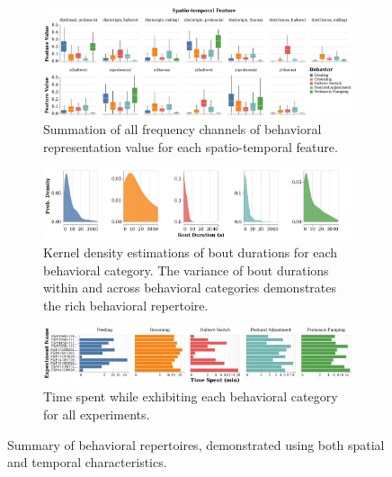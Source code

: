 \begin{figure}[htb!]
	\centering
	\begin{subfigure}[b]{0.995\linewidth}
		\centering
		\includegraphics[width=\linewidth]{figures/FeatureDistributions_perBehavior-Ann.pdf}
		\caption{Summation of all frequency channels of behavioral representation value for each spatio-temporal feature.\label{figure:feature-distributions}}
	\end{subfigure}%

	\centering
	\begin{subfigure}[b]{0.995\linewidth}
		\centering
		\includegraphics[width=\linewidth]{figures/BoutDurationDistributions-Ann.pdf}
		\caption{Kernel density estimations of bout durations for each behavioral category. The variance of bout durations within and across behavioral categories demonstrates the rich behavioral repertoire. \label{figure:bout-durations}}
	\end{subfigure}%

	\centering
	\begin{subfigure}[b!]{0.995\linewidth}
		\centering
		\includegraphics[width=\linewidth]{figures/TimeSpent-perBehavior-Ann.pdf}
		\caption{Time spent while exhibiting each behavioral category for all experiments. \label{figure:time-spent-in-behaviors}}
	\end{subfigure}%
	\caption{Summary of behavioral repertoires, demonstrated using both spatial and temporal characteristics. \label{figure:summary-behavior-characteristics}}
\end{figure}


